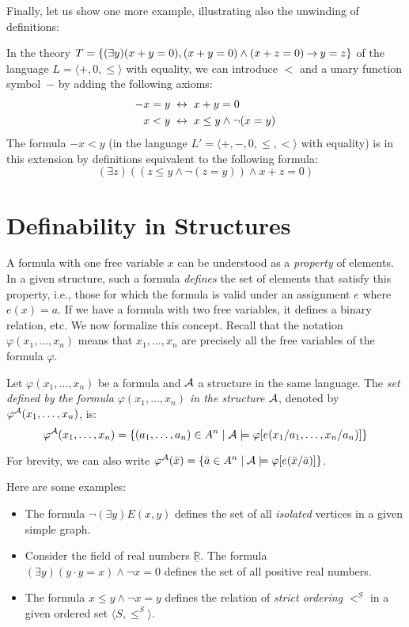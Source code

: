 Finally, let us show one more example, illustrating also the unwinding of definitions:
\begin{example}
    In the theory $T=\{(\exists y)(x+y=0),(x+y=0)\land(x+z=0)\mathbin{\rightarrow} y=z\}$ of the language $L=\langle +,0,\leq\rangle$ with equality, we can introduce $<$ and a unary function symbol~$-$ by adding the following axioms:
    \begin{align*}
        -x=y\ &\mathbin{\leftrightarrow}\ x+y=0\\
        x<y\ &\mathbin{\leftrightarrow}\ x\leq y\land\neg(x=y)
    \end{align*}
    The formula $-x<y$ (in the language $L'=\langle +,-,0,\leq,<\rangle$ with equality) is in this extension by definitions equivalent to the following formula:
    $$
    (\exists z)((z\leq y\land\neg(z=y))\land x+z=0)
    $$
\end{example}


\section{Definability in Structures}\label{section:definability}

A formula with one free variable $x$ can be understood as a \emph{property} of elements. In a given structure, such a formula \emph{defines} the set of elements that satisfy this property, i.e., those for which the formula is valid under an assignment $e$ where $e(x)=a$. If we have a formula with two free variables, it defines a binary relation, etc. We now formalize this concept. Recall that the notation $\varphi(x_1,\dots,x_n)$ means that $x_1,\dots,x_n$ are precisely all the free variables of the formula $\varphi$.

\begin{definition}
    Let $\varphi(x_1,\dots,x_n)$ be a formula and $\mathcal{A}$ a structure in the same language. The \emph{set defined by the formula $\varphi(x_1,\dots,x_n)$ in the structure $\mathcal{A}$}, denoted by $\varphi^{\mathcal{A}}(x_1,\dots,x_n)$, is:
    $$
    \varphi^{\mathcal{A}}(x_1,\dots,x_n)=\{(a_1,\dots,a_n)\in A^n\mid\mathcal{A}\models\varphi[e(x_1/a_1,\dots,x_n/a_n)]\}
    $$
\end{definition}
For brevity, we can also write $\varphi^{\mathcal{A}}(\bar x)=\{\bar a\in A^n\mid\mathcal{A}\models\varphi[e(\bar x/\bar a)]\}$.

\begin{example} Here are some examples:
    \begin{itemize}
        \item The formula $\neg(\exists y)E(x,y)$ defines the set of all \emph{isolated} vertices in a given simple graph.
        \item Consider the field of real numbers $\underline{\mathbb R}$. The formula $(\exists y)(y\cdot y=x)\land\neg x=0$ defines the set of all positive real numbers.
        \item The formula $x\leq y\land \neg x=y$ defines the relation of \emph{strict ordering} $<^S$ in a given ordered set $\langle S,\leq^S\rangle$.
    \end{itemize}
\end{example}

